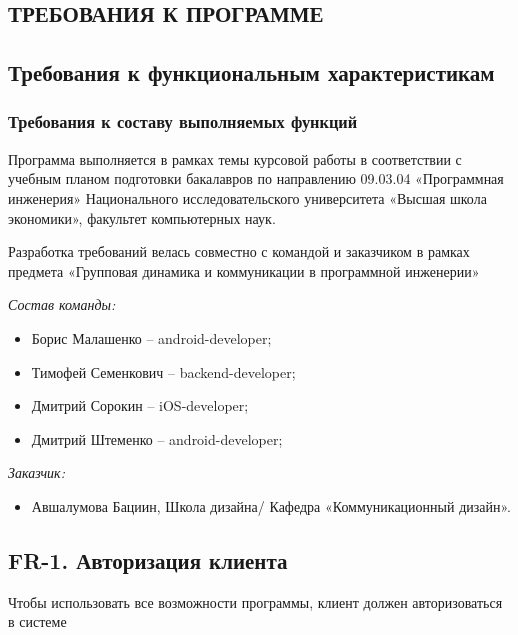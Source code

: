 \pagestyle{fancy}

\begin{center}
		\section{ТРЕБОВАНИЯ К ПРОГРАММЕ}
\end{center}	

\subsection{Требования к функциональным характеристикам} 
	
	\subsubsection{Требования к составу выполняемых функций}	

		\hspace{10mm} Программа выполняется в рамках темы курсовой работы в соответствии с учебным
		планом подготовки бакалавров по направлению 09.03.04 «Программная инженерия»
		Национального исследовательского университета «Высшая школа экономики», факультет компьютерных наук.
		
		\hspace{10mm} Разработка требований велась совместно с командой и заказчиком в рамках предмета «Групповая динамика и коммуникации в программной инженерии»
		
		\textit{Состав команды:}
		\begin{itemize}
			\item Борис Малашенко -- android-developer;
			\item Тимофей Семенкович -- backend-developer;
			\item Дмитрий Сорокин -- iOS-developer;
			\item Дмитрий Штеменко -- android-developer;
		\end{itemize}
		
		\textit{Заказчик:}
		\begin{itemize}
			\item Авшалумова Бациин, Школа дизайна/ Кафедра «Коммуникационный дизайн».
		\end{itemize}

	\subsection*{FR-1. Авторизация клиента}

	\hspace{10mm}Чтобы использовать все возможности программы, клиент должен авторизоваться в системе
	
